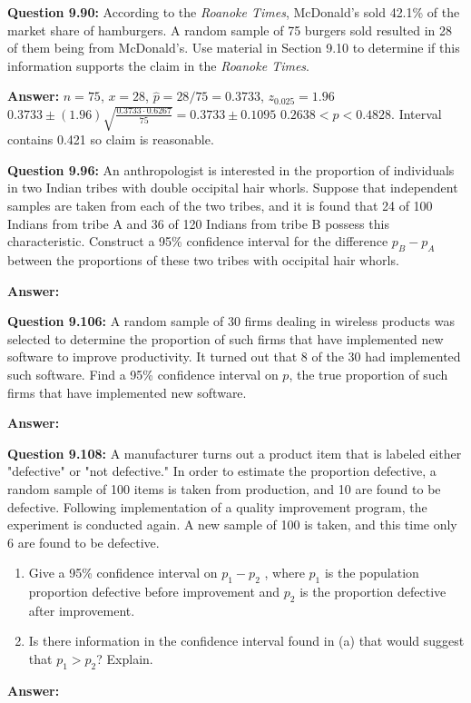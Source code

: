 \documentclass{article}
\begin{document}
\textbf{Question 9.90:}
According to the \textit{Roanoke Times}, McDonald’s
sold 42.1\% of the market share of hamburgers. A random 
sample of 75 burgers sold resulted in 28 of them
being from McDonald’s. Use material in Section 9.10
to determine if this information supports the claim in
the \textit{Roanoke Times}.
\begin{description}
    \item \textbf{Answer:} $n=75$, $x=28$, $\hat{p}=28/75=0.3733$, $z_{0.025}=1.96$\newline
    $0.3733\pm (1.96)\sqrt{\frac{0.3733\cdot 0.6267}{75}} = 0.3733\pm 0.1095$\newline
    \boldmath$0.2638<p<0.4828$. Interval contains 0.421 so claim is reasonable.
\end{description}

\textbf{Question 9.96:}
An anthropologist is interested in the proportion
of individuals in two Indian tribes with double 
occipital hair whorls. Suppose that independent samples are
taken from each of the two tribes, and it is found that
24 of 100 Indians from tribe A and 36 of 120 Indians
from tribe B possess this characteristic. Construct a
95\% confidence interval for the difference $p_B − p_A$ 
between the proportions of these two tribes with occipital
hair whorls.
\begin{description}
    \item \textbf{Answer:} 
\end{description}

\textbf{Question 9.106:}
A random sample of 30 firms dealing in wireless
products was selected to determine the proportion of
such firms that have implemented new software to 
improve productivity. It turned out that 8 of the 30 had
implemented such software. Find a 95\% confidence 
interval on $p$, the true proportion of such firms that have
implemented new software.
\begin{description}
    \item \textbf{Answer:} 
\end{description}

\textbf{Question 9.108:}
A manufacturer turns out a product item that
is labeled either "defective" or "not defective." In order
to estimate the proportion defective, a random sample 
of 100 items is taken from production, and 10 are
found to be defective. Following implementation of a
quality improvement program, the experiment is 
conducted again. A new sample of 100 is taken, and this
time only 6 are found to be defective.
\begin{enumerate}[label = (\alph*) ]
    \item Give a 95\% confidence interval on $p_1 − p_2$ , 
    where $p_1$ is the population proportion defective before 
    improvement and $p_2$ is the proportion defective after
    improvement.
    \item Is there information in the confidence interval
    found in (a) that would suggest that $p_1 > p_2$? 
    Explain.
\end{enumerate}
\begin{description}
    \item \textbf{Answer:} 
\end{description}
\end{document}
